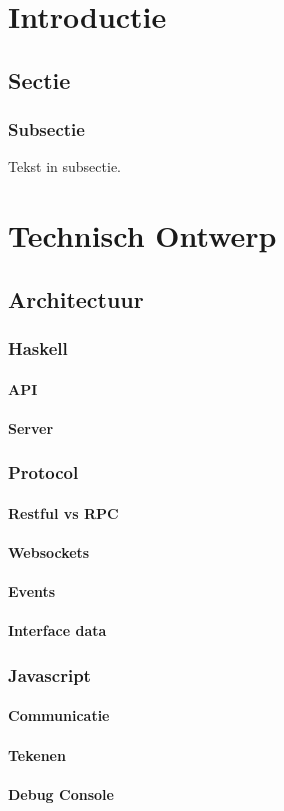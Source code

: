 \documentclass[a4paper]{report}
\begin{document}


\chapter{Introductie}
\section{Sectie}
\subsection{Subsectie}
Tekst in subsectie.

\chapter{Technisch Ontwerp}
\section{Architectuur}
\subsection{Haskell}
\subsubsection{API}
\subsubsection{Server}
\subsection{Protocol}
\subsubsection{Restful vs RPC}
\subsubsection{Websockets}
\subsubsection{Events}
\subsubsection{Interface data}
\subsection{Javascript}
\subsubsection{Communicatie}
\subsubsection{Tekenen}
\subsubsection{Debug Console}

\newpage


\end{document}
